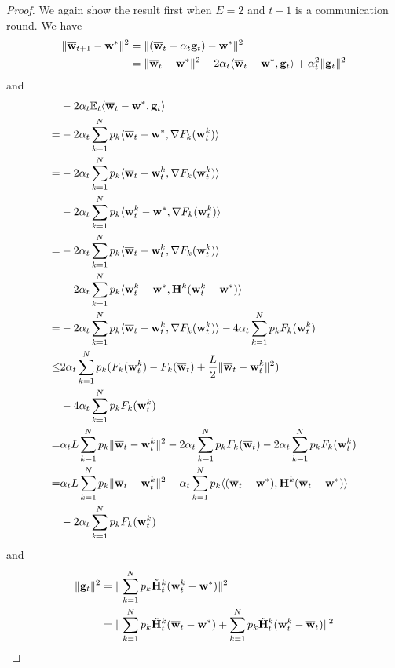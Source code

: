 \begin{proof}
	We again show the result first when $E=2$ and $t-1$ is a communication
	round. We have 
	\begin{align*}
	\|{\overline{\mathbf{w}}}_{t+1}-{\mathbf{w}}^{\ast}\|^{2} & =\|({\overline{\mathbf{w}}}_{t}-\alpha_{t}{\mathbf{g}}_{t})-{\mathbf{w}}^{\ast}\|^{2}\\
	& =\|{\overline{\mathbf{w}}}_{t}-{\mathbf{w}}^{\ast}\|^{2}-2\alpha_{t}\langle{\overline{\mathbf{w}}}_{t}-{\mathbf{w}}^{\ast},{\mathbf{g}}_{t}\rangle+\alpha_{t}^{2}\|{\mathbf{g}}_{t}\|^{2}
	\end{align*}
	and 
	\begin{align*}
	& -2\alpha_{t}\mathbb{E}_{t}\langle{\overline{\mathbf{w}}}_{t}-{\mathbf{w}}^{\ast},{\mathbf{g}}_{t}\rangle\\
	=&-2\alpha_{t}\sum_{k=1}^{N}p_{k}\langle{\overline{\mathbf{w}}}_{t}-{\mathbf{w}}^{\ast},\nabla F_{k}({\mathbf{w}}_{t}^{k})\rangle\\
	=& -2\alpha_{t}\sum_{k=1}^{N}p_{k}\langle{\overline{\mathbf{w}}}_{t}-{\mathbf{w}}_{t}^{k},\nabla F_{k}({\mathbf{w}}_{t}^{k})\rangle  \\
	&-2\alpha_{t}\sum_{k=1}^{N}p_{k}\langle {\mathbf{w}}_{t}^{k}-{\mathbf{w}}^{\ast},\nabla F_{k}({\mathbf{w}}_{t}^{k})\rangle\\
	=&-2\alpha_{t}\sum_{k=1}^{N}p_{k}\langle{\overline{\mathbf{w}}}_{t}-{\mathbf{w}}_{t}^{k},\nabla F_{k}({\mathbf{w}}_{t}^{k})\rangle\\
	& -2\alpha_{t}\sum_{k=1}^{N}p_{k}\langle {\mathbf{w}}_{t}^{k}-{\mathbf{w}}^{\ast},{\mathbf{H}}^{k}({\mathbf{w}}_{t}^{k}-{\mathbf{w}}^{\ast})\rangle\\
	=&-2\alpha_{t}\sum_{k=1}^{N}p_{k}\langle{\overline{\mathbf{w}}}_{t}-{\mathbf{w}}_{t}^{k},\nabla F_{k}({\mathbf{w}}_{t}^{k})\rangle -4\alpha_{t}\sum_{k=1}^{N}p_{k}F_{k}({\mathbf{w}}_{t}^{k})\\
	\leq & 2\alpha_{t}\sum_{k=1}^{N}p_{k}(F_{k}({\mathbf{w}}_{t}^{k})-F_{k}({\overline{\mathbf{w}}}_{t})+\frac{L}{2}\|{\overline{\mathbf{w}}}_{t}-{\mathbf{w}}_{t}^{k}\|^{2}) \\
	&-4\alpha_{t}\sum_{k=1}^{N}p_{k}F_{k}({\mathbf{w}}_{t}^{k})\\
	=&\alpha_{t}L\sum_{k=1}^{N}p_{k}\|{\overline{\mathbf{w}}}_{t}-{\mathbf{w}}_{t}^{k}\|^{2}-2\alpha_{t}\sum_{k=1}^{N}p_{k}F_{k}({\overline{\mathbf{w}}}_{t})-2\alpha_{t}\sum_{k=1}^{N}p_{k}F_{k}({\mathbf{w}}_{t}^{k})\\
	=&\alpha_{t}L\sum_{k=1}^{N}p_{k}\|{\overline{\mathbf{w}}}_{t}-{\mathbf{w}}_{t}^{k}\|^{2}-\alpha_{t}\sum_{k=1}^{N}p_{k}\langle({\overline{\mathbf{w}}}_{t}-{\mathbf{w}}^{\ast}),{\mathbf{H}}^{k}({\overline{\mathbf{w}}}_{t}-{\mathbf{w}}^{\ast})\rangle\\
	& -2\alpha_{t}\sum_{k=1}^{N}p_{k}F_{k}({\mathbf{w}}_{t}^{k})
	\end{align*}
	and 
	\begin{align*}
	\|\vg_{t}\|^{2} & =\|\sum_{k=1}^{N}p_{k}\tilde{\vH}_{t}^{k}(\vw_{t}^{k}-\vw^{\ast})\|^{2}\\
	& =\|\sum_{k=1}^{N}p_{k}\tilde{\vH}_{t}^{k}(\ov{w}_{t}-\vw^{\ast})+\sum_{k=1}^{N}p_{k}\tilde{\vH}_{t}^{k}(\vw_{t}^{k}-\ov{w}_{t})\|^{2}\\

\end{align*}
\end{proof}

